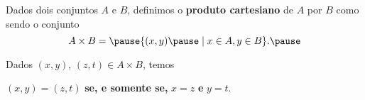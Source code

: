 \documentclass{beamer}
\begin{document}
    \begin{frame}
        \begin{definicao}
        Dados dois conjuntos $A$ e $B$, \pause definimos o \textbf{produto cartesiano} \pause de $A$ por $B$ como sendo o conjunto\pause
        \[
            A \times B = \pause \{(x,y) \pause \mid x\in A, y\in B\}.\pause
        \]
        \end{definicao}

        Dados $(x,y)$, \pause $(z,t) \in A\times B$, \pause temos
        \begin{center}
            $(x,y) = (z,t)$ \pause \textbf{se, e somente se,} $x = z$ \pause \textbf{e} $y = t$.
        \end{center}

    \end{frame}
\end{document}

